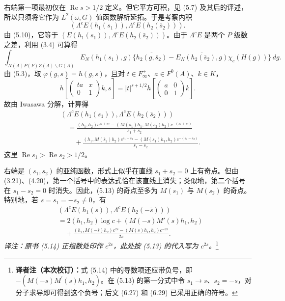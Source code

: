 右端第一项最初仅在 $\operatorname{Re}s>1/2$ 定义。但它平方可积，见 (5.7) 及其后的评述，所以只须将它作为 $L^2(\omega,G)$ 值函数解析延拓。于是考察内积
\begin{equation}
 (\Lambda^cE(h_1(s_1)),\Lambda^cE(h_2(\bar s_2))).\tag{5.12}
\end{equation}
由 (5.10)，它等于 $(E(h_1(s_1)),\Lambda^cE(h_2(\bar s_2)))$。由于
$\Lambda^cE$ 是两个 $P$ 级数之差，利用 (3.4) 可算得
\[
 \int_{N(A)P(F)Z(A)\backslash G(A)}E_N(h_1(s_1),g)
 \{\overline{h_2(g,\bar s_2)}-\overline{E_N(h_2(\bar s_2),g)}\chi_c(H(g))\}\,dg.
\]
由 (5.3)，取 $\varphi(g,s)=h(g,s)$，且对 $t\in F_\infty^+$、$a\in F^0(A)$、$k\in K$，
\[
 h\!\left[\begin{pmatrix}ta&x\\0&1\end{pmatrix}k,s\right]
 =|t|^{s+1/2}h\!\left[\begin{pmatrix}a&0\\0&1\end{pmatrix}k\right].
\]
故由 Iwasawa 分解，计算得
\begin{equation}
\begin{split}
 &(\Lambda^cE(h_1(s_1)),\Lambda^cE(h_2(\bar s_2)))\\
 &\quad=\frac{(h_1,h_2)c^{s_1+s_2}
 -(M(s_1)h_1,M(\bar s_2)h_2)c^{-(s_1+s_2)}}{s_1+s_2}\\
 &\qquad+\frac{(h_1,M(\bar s_2)h_2)c^{s_1-s_2}
 -(M(s_1)h_1,h_2)c^{-(s_1-s_2)}}{s_1-s_2}.
\end{split}\tag{5.13}
\end{equation}
这里 $\operatorname{Re}s_1>\operatorname{Re}s_2>1/2$。

右端是 $(s_1,s_2)$ 的亚纯函数，形式上似乎在直线 $s_1+s_2=0$ 上有奇点。但由 (3.21)、(4.20)，第一个括号中的表达式恰在该直线上消失；类似地，第二个括号在
$s_1-s_2=0$ 时消失。因此，(5.13) 的奇点至多为 $M(s_1)$ 与 $M(s_2)$ 的奇点。特别地，若
$s=s_1=-s_2\ne0$，有
\begin{equation}
\begin{split}
 &(\Lambda^cE(h_1(s)),\Lambda^cE(h_2(-\bar s)))\\
 &=2(h_1,h_2)\log c+(M(-s)M'(s)h_1,h_2)\\
 &\quad+\frac{(h_1,M(-\bar s)h_2)c^{2s}-(M(s)h_1,h_2)c^{-2s}}{2s}.
\end{split}\tag{5.14}
\end{equation}
\noindent\textit{译注：原书 (5.14) 正指数处印作 $c^{2c}$，此处按 (5.13) 的代入写为 $c^{2s}$。}\footnote{\textbf{译者注（本次校订）：}式 (5.14) 中的导数项还应带负号，即 $-(M(-s)M^{\prime}(s)h_1,h_2)$。在 (5.13) 的第一分式中令 $s_1\to s$、$s_2=-s$，对分子求导即可得到这个负号；后文 (6.27) 和 (6.29) 已采用正确的符号。}

